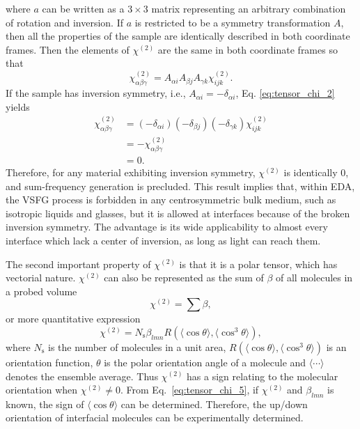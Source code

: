 where $a$ can be written as a $3 \times 3$ matrix representing an arbitrary combination of rotation and inversion.
If $a$ is restricted to be a symmetry transformation $A$, then all the properties of the sample are identically described in both coordinate frames.
Then the elements of $\chi^{(2)}$ are the same in both coordinate frames so that
\begin{equation}
\chi^{(2)}_{\alpha\beta\gamma} = A_{\alpha i}A_{\beta j}A_{\gamma k}\chi^{(2)}_{ijk}.
\label{eq:tensor_chi_2}
\end{equation}
If the sample has inversion symmetry\cite{Franken1963}, i.e., $A_{\alpha i} = -\delta_{\alpha i}$, Eq. \ref{eq:tensor_chi_2} yields
\begin{align}
\chi^{(2)}_{\alpha\beta\gamma} &= (-\delta_{\alpha i}) (-\delta_{\beta j}) (-\delta_{\gamma k})\chi^{(2)}_{ijk} \nonumber\\
    & = -\chi^{(2)}_{\alpha\beta\gamma} \nonumber\\
    & = 0.
\label{eq:tensor_chi_3}
\end{align}
Therefore, for any material exhibiting inversion symmetry, $\chi^{(2)}$ is identically 0, and sum-frequency generation is precluded.
This result implies that, within EDA, the VSFG process is forbidden in any centrosymmetric bulk medium\cite{CheM2012},
such as isotropic liquids and glasses, but it is allowed at interfaces because of the broken inversion symmetry\cite{PF00}.
The advantage is its wide applicability to almost every interface which lack a center of inversion, as long as light can reach them. 

%
The second important property of $\chi^{(2)}$ is that it is a polar tensor, which has vectorial nature\cite{Nihonyanagi2013}. 
$\chi^{(2)}$ can also be represented as
the sum of $\beta$ of all molecules in a probed volume
\begin{equation}
\chi^{(2)} = \sum \beta, \nonumber
\label{eq:tensor_chi_4}
\end{equation}
or more quantitative expression
\begin{equation}
\chi^{(2)} = N_\text{s} \beta_{lmn} R(\langle \cos\theta\rangle, \langle \cos^3\theta\rangle),
\label{eq:tensor_chi_5}
\end{equation}
where $N_\text{s}$ is the number of molecules in a unit area, $R(\langle \cos\theta\rangle, \langle \cos^3\theta\rangle)$ is an orientation function,
$\theta$ is the polar orientation angle of a molecule and $\langle \cdots \rangle$ denotes the ensemble average.
Thus $\chi^{(2)}$ has a sign relating to the molecular orientation when $\chi^{(2)}\neq 0$. 
From Eq.~\ref{eq:tensor_chi_5}, if $\chi^{(2)}$ and $\beta_{lmn}$ is known, the sign of $\langle \cos\theta\rangle$ can be determined. 
Therefore, the up/down orientation of interfacial molecules can be experimentally determined.

